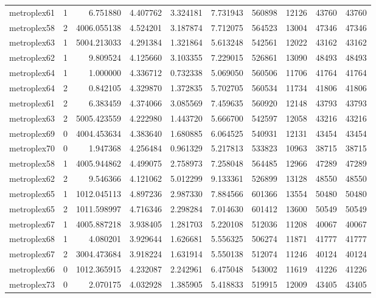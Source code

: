 \begin{longtable}{|l|r|r|r|r|r|r|r|r|r|}
metroplex61 & 1 & 6.751880 & 4.407762 & 3.324181 & 7.731943 & 560898 & 12126 & 43760 & 43760 \\
metroplex58 & 2 & 4006.055138 & 4.524201 & 3.187874 & 7.712075 & 564523 & 13004 & 47346 & 47346 \\
metroplex63 & 1 & 5004.213033 & 4.291384 & 1.321864 & 5.613248 & 542561 & 12022 & 43162 & 43162 \\
metroplex62 & 1 & 9.809524 & 4.125660 & 3.103355 & 7.229015 & 526861 & 13090 & 48493 & 48493 \\
metroplex64 & 1 & 1.000000 & 4.336712 & 0.732338 & 5.069050 & 560506 & 11706 & 41764 & 41764 \\
metroplex64 & 2 & 0.842105 & 4.329870 & 1.372835 & 5.702705 & 560534 & 11734 & 41806 & 41806 \\
metroplex61 & 2 & 6.383459 & 4.374066 & 3.085569 & 7.459635 & 560920 & 12148 & 43793 & 43793 \\
metroplex63 & 2 & 5005.423559 & 4.222980 & 1.443720 & 5.666700 & 542597 & 12058 & 43216 & 43216 \\
metroplex69 & 0 & 4004.453634 & 4.383640 & 1.680885 & 6.064525 & 540931 & 12131 & 43454 & 43454 \\
metroplex70 & 0 & 1.947368 & 4.256484 & 0.961329 & 5.217813 & 533823 & 10963 & 38715 & 38715 \\
metroplex58 & 1 & 4005.944862 & 4.499075 & 2.758973 & 7.258048 & 564485 & 12966 & 47289 & 47289 \\
metroplex62 & 2 & 9.546366 & 4.121062 & 5.012299 & 9.133361 & 526899 & 13128 & 48550 & 48550 \\
metroplex65 & 1 & 1012.045113 & 4.897236 & 2.987330 & 7.884566 & 601366 & 13554 & 50480 & 50480 \\
metroplex65 & 2 & 1011.598997 & 4.716346 & 2.298284 & 7.014630 & 601412 & 13600 & 50549 & 50549 \\
metroplex67 & 1 & 4005.887218 & 3.938405 & 1.281703 & 5.220108 & 512036 & 11208 & 40067 & 40067 \\
metroplex68 & 1 & 4.080201 & 3.929644 & 1.626681 & 5.556325 & 506274 & 11871 & 41777 & 41777 \\
metroplex67 & 2 & 3004.473684 & 3.918224 & 1.631914 & 5.550138 & 512074 & 11246 & 40124 & 40124 \\
metroplex66 & 0 & 1012.365915 & 4.232087 & 2.242961 & 6.475048 & 543002 & 11619 & 41226 & 41226 \\
metroplex73 & 0 & 2.070175 & 4.032928 & 1.385905 & 5.418833 & 519915 & 12009 & 43405 & 43405 \\

\end{longtable}
